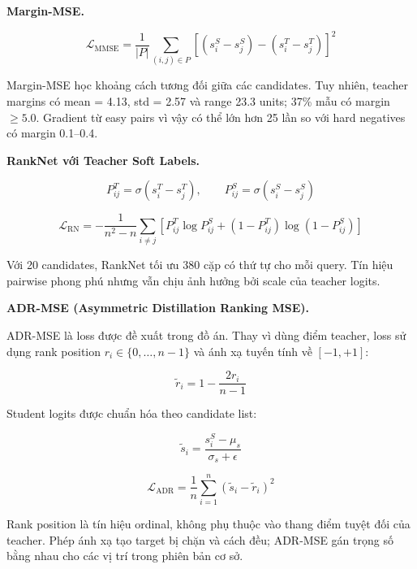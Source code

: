 \documentclass[../DoAn.tex]{subfiles}
\begin{document}
\noindent\textbf{Margin-MSE.}

\[
\mathcal{L}_{\text{MMSE}}
=
\frac{1}{|P|}
\sum_{(i,j)\in P}
\left[
(s_i^S-s_j^S)
-
(s_i^T-s_j^T)
\right]^2
\]

Margin-MSE học khoảng cách tương đối giữa các candidates. Tuy nhiên, teacher margins có mean = 4.13, std = 2.57 và range 23.3 units; 37\% mẫu có margin $\geq 5.0$. Gradient từ easy pairs vì vậy có thể lớn hơn 25 lần so với hard negatives có margin 0.1--0.4.

\noindent\textbf{RankNet với Teacher Soft Labels.}

\[
P_{ij}^T=\sigma(s_i^T-s_j^T),
\qquad
P_{ij}^S=\sigma(s_i^S-s_j^S)
\]

\[
\mathcal{L}_{\text{RN}}
=
-\frac{1}{n^2-n}
\sum_{i\neq j}
\left[
P_{ij}^T\log P_{ij}^S
+
(1-P_{ij}^T)\log(1-P_{ij}^S)
\right]
\]

Với 20 candidates, RankNet tối ưu 380 cặp có thứ tự cho mỗi query. Tín hiệu pairwise phong phú nhưng vẫn chịu ảnh hưởng bởi scale của teacher logits.

\noindent\textbf{ADR-MSE (Asymmetric Distillation Ranking MSE).}

ADR-MSE là loss được đề xuất trong đồ án. Thay vì dùng điểm teacher, loss sử dụng rank position $r_i\in\{0,\ldots,n-1\}$ và ánh xạ tuyến tính về $[-1,+1]$:

\[
\tilde{r}_i
=
1-\frac{2r_i}{n-1}
\]

Student logits được chuẩn hóa theo candidate list:

\[
\tilde{s}_i
=
\frac{s_i^S-\mu_s}{\sigma_s+\epsilon}
\]

\[
\mathcal{L}_{\text{ADR}}
=
\frac{1}{n}
\sum_{i=1}^{n}
\left(\tilde{s}_i-\tilde{r}_i\right)^2
\]

Rank position là tín hiệu ordinal, không phụ thuộc vào thang điểm tuyệt đối của teacher. Phép ánh xạ tạo target bị chặn và cách đều; ADR-MSE gán trọng số bằng nhau cho các vị trí trong phiên bản cơ sở.
\end{document}

